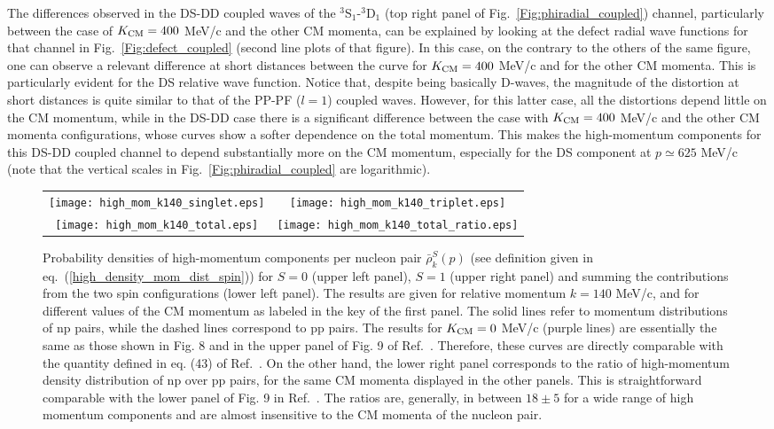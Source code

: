 \documentclass[aps,twocolumn,showpacs,preprintnumbers,amsmath,amssymb,nofootinbib,superscriptaddress,showkeys,noeprint]{revtex4-1}
\begin{document}
 The differences observed in the DS-DD coupled waves of the
 ${}^3$S$_1$-${}^3$D$_1$ (top right panel of
 Fig.~\ref{Fig:phiradial_coupled}) channel, particularly between the
 case of $K_{\rm CM}=400$ MeV/c and the other CM momenta, can be
 explained by looking at the defect radial wave functions for that
 channel in Fig.~\ref{Fig:defect_coupled} (second line plots of that
 figure). In this case, on the contrary to the others of the same
 figure, one can observe a relevant difference at short distances
 between the curve for $K_{\rm CM}=400$ MeV/c and for the other CM
 momenta.  This is particularly evident for the DS relative wave
 function. Notice that, despite being basically D-waves, the magnitude
 of the distortion at short distances is quite similar to that of the
 PP-PF ($l=1$) coupled waves. However, for this latter case, all the
 distortions depend little on the CM momentum, while in the DS-DD case
 there is a significant difference between the case with $K_{\rm
   CM}=400$ MeV/c and the other CM momenta configurations, whose
 curves show a softer dependence on the total momentum.  This makes
 the high-momentum components for this DS-DD coupled channel to depend
 substantially more on the CM momentum, especially for the DS
 component at $p\simeq 625$ MeV/c (note that the vertical scales in
 Fig.~\ref{Fig:phiradial_coupled} are logarithmic).
 
\begin{figure*}[!ht]
\begin{tabular}{cc}
\texttt{[image: high\_mom\_k140\_singlet.eps]}&
\texttt{[image: high\_mom\_k140\_triplet.eps]}\\
\texttt{[image: high\_mom\_k140\_total.eps]}&
\texttt{[image: high\_mom\_k140\_total\_ratio.eps]}
\end{tabular}
\caption{Probability densities of high-momentum components per nucleon
  pair $\bar{\rho}^{S}_k(p)$ (see definition given in
  eq.~(\ref{high_density_mom_dist_spin})) for $S=0$ (upper left
  panel), $S=1$ (upper right panel) and summing the contributions from
  the two spin configurations (lower left panel).  The results are
  given for relative momentum $k=140$ MeV/c, and for different values
  of the CM momentum as labeled in the key of the first panel. The
  solid lines refer to momentum distributions of np pairs, while the
  dashed lines correspond to pp pairs.  The results for $K_{\rm CM}=0$
  MeV/c (purple lines) are essentially the same as those shown in
  Fig. 8 and in the upper panel of Fig. 9 of
  Ref.~\cite{RuizSimo:2017tcb}. Therefore, these curves are directly
  comparable with the quantity defined in eq. (43) of
  Ref.~\cite{RuizSimo:2017tcb}.  On the other hand, the lower right
  panel corresponds to the ratio of high-momentum density distribution
  of np over pp pairs, for the same CM momenta displayed in the other
  panels. This is straightforward comparable with the lower panel of
  Fig. 9 in Ref.~\cite{RuizSimo:2017tcb}.  The ratios are, generally,
  in between $18\pm5$ for a wide range of high momentum components and
  are almost insensitive to the CM momenta of the nucleon pair.}
\label{Fig:density_high_mom}
\end{figure*}
\end{document}
